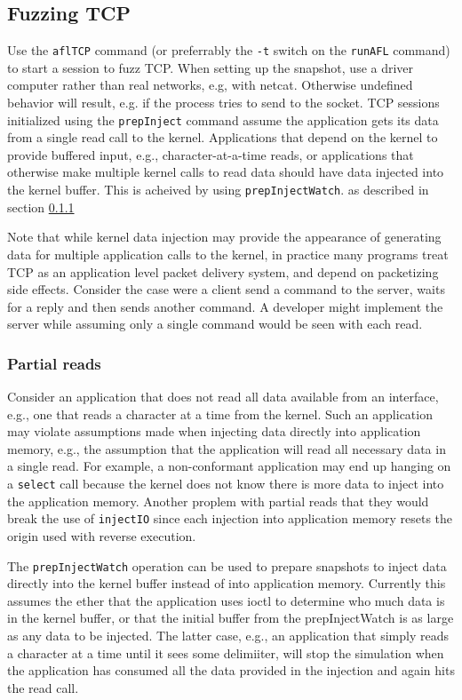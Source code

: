 \documentclass[titlepage]{article}
\begin{document}
\subsection{Fuzzing TCP}
Use the {\tt aflTCP} command (or preferrably the {\tt -t} switch on the {\tt runAFL} command) to start a session to fuzz TCP.  
When setting up the snapshot, use a driver computer rather than
real networks, e.g, with netcat.  Otherwise undefined behavior will result, e.g. if the process tries to send to the socket.
TCP sessions initialized using the {\tt prepInject} command assume the application gets its data from a single read call to the kernel.
Applications that depend on the kernel to provide buffered input, e.g., character-at-a-time reads, or applications that otherwise make multiple
kernel calls to read data should have data injected into the kernel buffer.  This is acheived by using {\tt prepInjectWatch}. 
as described in section \ref{partial-reads} 

Note that while kernel data injection may provide the appearance of generating data for multiple application calls to the kernel, in practice
many programs treat TCP as an application level packet delivery system, and depend on packetizing side effects.  Consider the case were a client
send a command to the server, waits for a reply and then sends another command.  A developer might implement the server while assuming only a
single command would be seen with each read.

\subsubsection{Partial reads}
\label{partial-reads}
Consider an application that does not read all data available from an interface, e.g., one that reads a character at a time from the kernel.  
Such an application may violate assumptions made when injecting data directly into application memory, e.g., the assumption that the application
will read all necessary data in a single read.  For example, a non-conformant application may end up hanging on a {\tt select} call because
the kernel does not know there is more data to inject into the application memory.  Another proplem with partial reads that they would break
the use of {\tt injectIO} since each injection into application memory resets the origin used with reverse execution.

The {\tt prepInjectWatch} operation can be used to
prepare snapshots to inject data directly into the kernel buffer instead of into application memory.  Currently this assumes the ether that the application uses
ioctl to determine who much data is in the kernel buffer, or that the initial buffer from the prepInjectWatch is as large as any data to be injected.
The latter case, e.g., an application that simply reads a character at a time until it sees some delimiiter, will stop the simulation when the application
has consumed all the data provided in the injection and again hits the read call.
\end{document}
